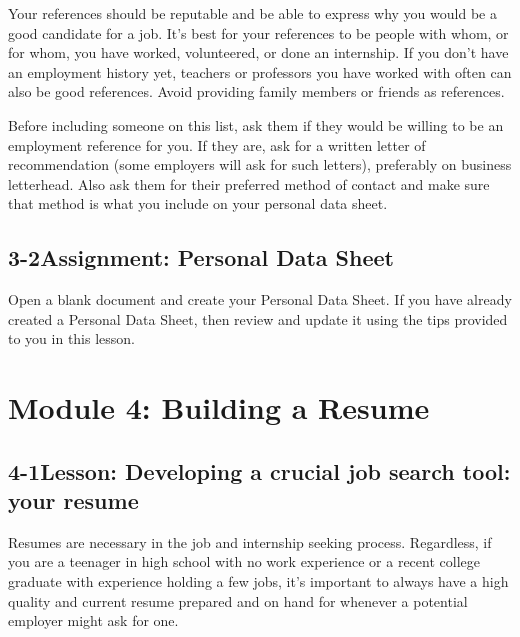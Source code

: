 Your references should be reputable and be able to express why you would be a good candidate for a job. It's best for your references to be people with whom, or for whom, you have worked, volunteered, or done an internship. If you don't have an employment history yet, teachers or professors you have worked with often can also be good references. Avoid providing family members or friends as references.

Before including someone on this list, ask them if they would be willing to be an employment reference for you. If they are, ask for a written letter of recommendation (some employers will ask for such letters), preferably on business letterhead. Also ask them for their preferred method of contact and make sure that method is what you include on your personal data sheet.

\pagebreak \subsection*{3-2\quad Assignment: Personal Data Sheet}
Open a blank document and create your Personal Data Sheet. If you have already created a Personal Data Sheet, then review and update it using the tips provided to you in this lesson.


\pagebreak \section*{Module 4:	Building a Resume}
\noindent\makebox[\textwidth]{\rule{\linewidth}{0.4pt}}  \localtableofcontents
\noindent\makebox[\textwidth]{\rule{\linewidth}{0.4pt}}


\pagebreak \subsection*{4-1\quad Lesson: Developing a crucial job search tool: your resume}
Resumes are necessary in the job and internship seeking process. Regardless, if you are a teenager in high school with no work experience or a recent college graduate with experience holding a few jobs, it's important to always have a high quality and current resume prepared and on hand for whenever a potential employer might ask for one.

